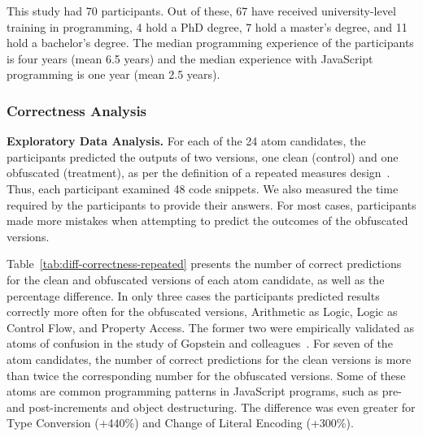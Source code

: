 This study had 70 participants. Out of these, 67 have received university-level training in programming, 4 hold a PhD degree, 7 hold a master's degree, and 11 hold a bachelor's degree. 
The median programming experience of the participants is four years (mean 6.5 years) and the median experience with JavaScript programming is one year (mean 2.5 years). 

\subsubsection{Correctness Analysis}\label{sec:repeated:correct}

{\bf Exploratory Data Analysis.}
For each of the 24 atom candidates, the participants predicted the outputs of two versions, one clean (control) and one obfuscated (treatment), as per the definition of a repeated measures design~\cite{Hunter-Experimenters}. Thus, each participant examined 48 code snippets.  We also measured the time required by the participants to provide their answers. For most cases, participants made more mistakes when attempting to predict the outcomes of the obfuscated versions. 

Table~\ref{tab:diff-correctness-repeated} presents the number of correct predictions for the clean and obfuscated versions of each atom candidate, as well as the percentage difference. In only three cases the participants predicted results correctly more often for the obfuscated versions, Arithmetic as Logic, Logic as Control Flow, and Property Access. The former two were empirically validated as atoms of confusion in the study of Gopstein and colleagues~\cite{DBLP:conf/sigsoft/GopsteinIYDZYC17}. For seven of the atom candidates, the number of correct predictions for the clean versions is more than twice the corresponding number for the obfuscated versions.  Some of these atoms are common programming patterns in JavaScript programs, such as pre- and post-increments and object destructuring. The difference was even greater for Type Conversion (+440\%) and Change of Literal Encoding (+300\%). 

